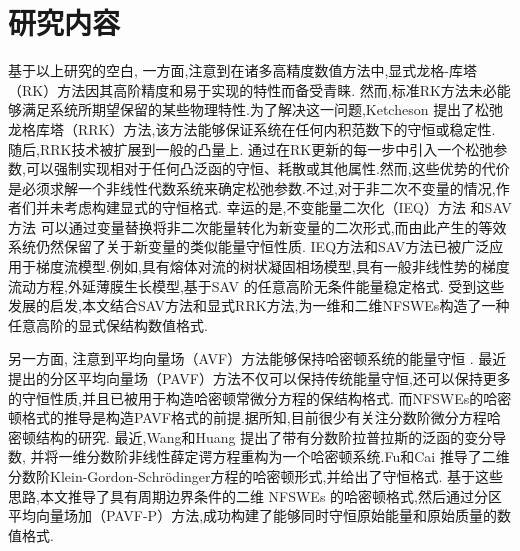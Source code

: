 \section{研究内容}
基于以上研究的空白, 
一方面,注意到在诸多高精度数值方法中,显式龙格-库塔（RK）方法因其高阶精度和易于实现的特性而备受青睐.
然而,标准RK方法未必能够满足系统所期望保留的某些物理特性.为了解决这一问题,Ketcheson \cite{ketchesonRelaxationRungeKutta2019} 提出了松弛龙格库塔（RRK）方法,该方法能够保证系统在任何内积范数下的守恒或稳定性.
随后,RRK技术被扩展到一般的凸量上\cite{ranochaRelaxationRungeKutta2020}.
通过在RK更新的每一步中引入一个松弛参数,可以强制实现相对于任何凸泛函的守恒、耗散或其他属性.然而,这些优势的代价是必须求解一个非线性代数系统来确定松弛参数.不过,对于非二次不变量的情况,作者们并未考虑构建显式的守恒格式.
幸运的是,不变能量二次化（IEQ）方法 \cite{yangLinearUnconditionallyEnergy2017, yangEfficientLinearSchemes2017} 和SAV方法 \cite{chengConvergenceEnergyconservingScheme2022} 可以通过变量替换将非二次能量转化为新变量的二次形式,而由此产生的等效系统仍然保留了关于新变量的类似能量守恒性质.
IEQ方法和SAV方法已被广泛应用于梯度流模型\cite{zhaoNumericalApproximationsPhase2017,shenScalarAuxiliaryVariable2018,liuExponentialScalarAuxiliary2020,chengMultipleScalarAuxiliary2018}.例如,具有熔体对流\cite{chenEfficientNumericalScheme2019}的树状凝固相场模型,具有一般非线性势的梯度流动方程\cite{yangConvergenceAnalysisInvariant2020},外延薄膜生长模型\cite{chengHighlyEfficientAccurate2019},基于SAV \cite{gongArbitrarilyHighorderUnconditionally2019}的任意高阶无条件能量稳定格式.
受到这些发展的启发,本文结合SAV方法和显式RRK方法,为一维和二维NFSWEs构造了一种任意高阶的显式保结构数值格式.

另一方面,
注意到平均向量场（AVF）方法能够保持哈密顿系统的能量守恒 \cite{buddGeometricIntegrationUsing1999,quispelNewClassEnergypreserving2008}.
最近提出的分区平均向量场（PAVF）方法不仅可以保持传统能量守恒,还可以保持更多的守恒性质,并且已被用于构造哈密顿常微分方程的保结构格式\cite{caiPartitionedAveragedVector2018}.
而NFSWEs的哈密顿格式的推导是构造PAVF格式的前提.据所知,目前很少有关注分数阶微分方程哈密顿结构的研究. 最近,Wang和Huang \cite{wangStructurepreservingNumericalMethods2018} 提出了带有分数阶拉普拉斯的泛函的变分导数,
并将一维分数阶非线性薛定谔方程重构为一个哈密顿系统.Fu和Cai \cite{fuStructurepreservingAlgorithmsTwodimensional2020} 推导了二维分数阶Klein-Gordon-Schr{\"o}dinger方程的哈密顿形式,并给出了守恒格式.
基于这些思路,本文推导了具有周期边界条件的二维 NFSWEs 的哈密顿格式,然后通过分区平均向量场加（PAVF-P）方法,成功构建了能够同时守恒原始能量和原始质量的数值格式.

